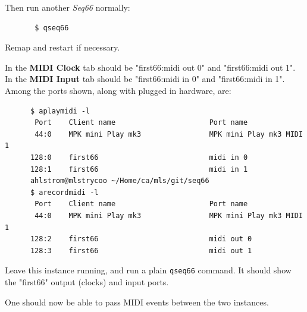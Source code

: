    Then run another \textsl{Seq66} normally:

   \begin{verbatim}
       $ qseq66
   \end{verbatim}

   Remap and restart if necessary.

   In the \textbf{MIDI Clock} tab should be "first66:midi out 0" and
   "first66:midi out 1".
   In the \textbf{MIDI Input} tab should be "first66:midi in 0" and
   "first66:midi in 1".
   Among the ports shown, along with plugged in hardware, are:

   \begin{verbatim}
      $ aplaymidi -l
       Port    Client name                      Port name
       44:0    MPK mini Play mk3                MPK mini Play mk3 MIDI 1
      128:0    first66                          midi in 0
      128:1    first66                          midi in 1
      ahlstrom@mlstrycoo ~/Home/ca/mls/git/seq66
      $ arecordmidi -l
       Port    Client name                      Port name
       44:0    MPK mini Play mk3                MPK mini Play mk3 MIDI 1
      128:2    first66                          midi out 0
      128:3    first66                          midi out 1
   \end{verbatim}

   Leave this instance running, and run a plain \texttt{qseq66} command.
   It should show the "first66" output (clocks) and input ports.

   One should now be able to pass MIDI events between the two instances.


